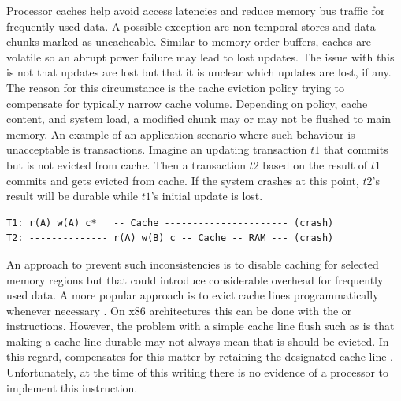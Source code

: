 
Processor caches help avoid access latencies and reduce memory bus traffic for
frequently used data. A possible exception are non-temporal stores and data
chunks marked as uncacheable. Similar to memory order buffers, caches are
volatile so an abrupt power failure may lead to lost updates. The issue with
this is not that updates are lost but that it is unclear which updates are lost,
if any. The reason for this circumstance is the cache eviction policy trying to
compensate for typically narrow cache volume. Depending on policy, cache
content, and system load, a modified chunk may or may not be flushed to main
memory. An example of an application scenario where such behaviour is
unacceptable is transactions. Imagine an updating transaction $t1$ that commits
but is not evicted from cache. Then a transaction $t2$ based on the result of
$t1$ commits and gets evicted from cache. If the system crashes at this point,
$t2$'s result will be durable while $t1$'s initial update is lost.


\begin{lstlisting}
T1: r(A) w(A) c*   -- Cache ---------------------- (crash)
T2: -------------- r(A) w(B) c -- Cache -- RAM --- (crash)
\end{lstlisting}

An approach to prevent such inconsistencies is to disable caching for selected
memory regions but that could introduce considerable overhead for frequently
used data. A more popular approach is to evict cache lines programmatically
whenever necessary \cite{condit2009better, dulloor2014system, oukid2017data}. On
x86 architectures this can be done with the  or 
instructions. However, the problem with a simple cache line flush such as
 is that making a cache line durable may not always mean that is
should be evicted. In this regard,  compensates for this matter by
retaining the designated cache line \cite{kolli2016high}. Unfortunately, at the
time of this writing there is no evidence of a processor to implement this
instruction.


